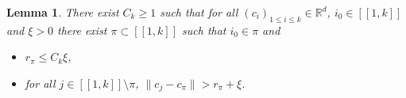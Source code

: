 \documentclass[a4paper, 11pt]{article}
\theoremstyle{plain}
\newtheorem{Lemma}[Theorem]{Lemma}
\theoremstyle{definition}
\newcommand{\R}{\mathbb{R}}
\newcommand{\range}[2]{[\![#1,#2]\!]}
\numberwithin{equation}{section}
\begin{document}
\begin{Lemma}
    \label{lemma_clustering}
    There exist $C_k\geq 1$ such that for all $(c_i)_{1\leq i\leq k}\in\R^d$, $i_0\in\range{1}{k}$ and $\xi>0$ there exist $\pi\subset\range{1}{k}$ such that $i_0\in\pi$ and
        \begin{itemize}
            \item $r_\pi\leq C_k\xi$,
            \item for all $j\in\range{1}{k}\setminus\pi$, $\|c_j-c_\pi\|>r_\pi+\xi$.
        \end{itemize}
\end{Lemma}

\end{document}
